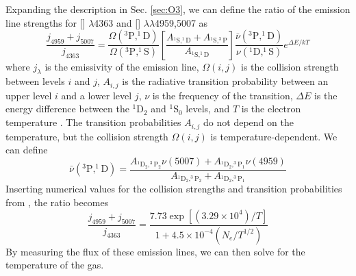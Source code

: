 %

Expanding the description in Sec. \ref{sec:O3}, we can define the ratio of the 
emission line strengths for [] $\lambda$4363 and [] 
$\lambda \lambda$4959,5007 as
\begin{equation}
    \frac{j_{4959} + j_{5007}}{j_{4363}} = \frac{\Omega(^3\text{P}, ^1\text{D})}{\Omega(^3\text{P}, ^1\text{S})} \left[ \frac{A_{^1\text{S}, ^1\text{D}} + A_{^1\text{S}, ^3\text{P}}}{A_{^1\text{S}, ^1\text{D}}} \right] \frac{\bar{\nu}(^3\text{P}, ^1\text{D})}{\nu(^1\text{D}, ^1\text{S})} e^{\Delta E/kT}
\end{equation}
where $j_\lambda$ is the emissivity of the emission line, $\Omega (i,j)$ is the 
collision strength between levels $i$ and $j$, $A_{i,j}$ is the radiative 
transition probability between an upper level $i$ and a lower level $j$, $\nu$ 
is the frequency of the transition, $\Delta E$ is the energy difference between 
the $^1$D$_2$ and $^1$S$_0$ levels, and $T$ is the electron temperature 
\cite{Osterbrock89}.  The transition probabilities $A_{i,j}$ do not depend on 
the temperature, but the collision strength $\Omega (i,j)$ is 
temperature-dependent.  We can define
\begin{equation}
    \bar{\nu}(^3\text{P}, ^1\text{D}) = \frac{A_{^1\text{D}_2, ^3\text{P}_2} \nu (5007) + A_{^1\text{D}_2, ^3\text{P}_1} \nu (4959)}{A_{^1\text{D}_2, ^3\text{P}_2} + A_{^1\text{D}_2, ^3\text{P}_1}}
\end{equation}
Inserting numerical values for the collision strengths and transition 
probabilities from \cite{Osterbrock89}, the ratio becomes
\begin{equation}
    \frac{j_{4959} + j_{5007}}{j_{4363}} = \frac{7.73 \exp[(3.29\times 10^4)/T]}{1 + 4.5\times 10^{-4} (N_e/T^{1/2})}
\end{equation}
By measuring the flux of these emission lines, we can then solve for the 
temperature of the gas.


